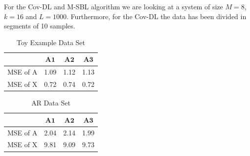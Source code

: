 For the Cov-DL and M-SBL algorithm we are looking at a system of size $M = 8$, $k = 16$ and $L = 1000$. Furthermore, for the Cov-DL the data has been divided in segments of 10 samples.

\begin{table}[H]
\centering
\begin{tabular}{|c|c|c|c|}
\hline 
 & $\mathbf{A1}$ & $\mathbf{A2}$ & $\mathbf{A3}$ \\ 
\hline 
MSE of A & 1.09 & 1.12 & 1.13 \\ 
\hline 
MSE of X & 0.72 & 0.74 & 0.72 \\ 
\hline 
\end{tabular} 
\caption{Toy Example Data Set}
\end{table}
\noindent

\begin{table}[H]
\centering
\begin{tabular}{|c|c|c|c|}
\hline 
 & $\mathbf{A1}$ & $\mathbf{A2}$ & $\mathbf{A3}$ \\ 
\hline 
MSE of A & 2.04 & 2.14 & 1.99 \\ 
\hline 
MSE of X & 9.81 & 9.09 & 9.73 \\ 
\hline
\end{tabular} 
\caption{AR Data Set}
\end{table}

